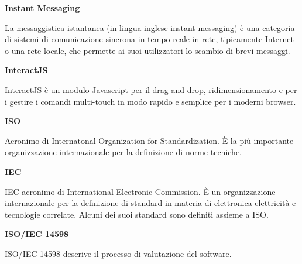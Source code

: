 \bigskip
\begin{addmargin}[0em]{0em}		
	\textbf{\underline{Instant Messaging}}
\end{addmargin}

\medskip
\begin{addmargin}[5em]{1em}	
La messaggistica istantanea (in lingua inglese instant messaging) è una categoria di sistemi di comunicazione sincrona in tempo reale in rete, tipicamente Internet o una rete locale, che permette ai suoi utilizzatori lo scambio di brevi messaggi.
\end{addmargin}	

\bigskip
\begin{addmargin}[0em]{0em}		
	\textbf{\underline{InteractJS}}
\end{addmargin}

\medskip
\begin{addmargin}[5em]{1em}	
InteractJS è un modulo Javascript per il drag and drop, ridimensionamento e per i gestire i comandi multi-touch in modo rapido e semplice per i moderni browser.
\end{addmargin}

\bigskip
\begin{addmargin}[0em]{0em}
	\textbf{\underline{ISO}}
\end{addmargin}
	
\medskip
\begin{addmargin}[5em]{1em}	
Acronimo di Internatonal Organization for Standardization. È la più importante organizzazione internazionale per la definizione di norme tecniche. 
\end{addmargin}

\bigskip
\begin{addmargin}[0em]{0em}
	\textbf{\underline{IEC}}
\end{addmargin}
	
\medskip
\begin{addmargin}[5em]{1em}	
IEC acronimo di International Electronic Commission. È un organizzazione internazionale per la definizione di standard in materia di elettronica elettricità e tecnologie correlate. Alcuni dei suoi standard sono definiti assieme a ISO.
\end{addmargin}	

\bigskip
\begin{addmargin}[0em]{0em}
	\textbf{\underline{ISO/IEC 14598}}
\end{addmargin}
	
\medskip
\begin{addmargin}[5em]{1em}	
ISO/IEC 14598 descrive il processo di valutazione del software.  
\end{addmargin}	

